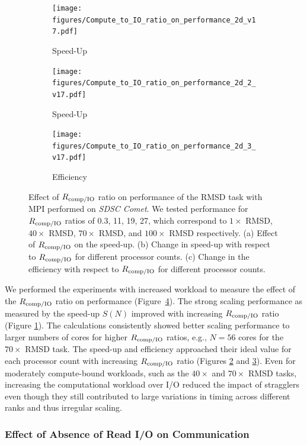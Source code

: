 \begin{figure}[!htb]
  \centering
  \begin{subfigure} {.3\textwidth}
    \texttt{[image: figures/Compute\_to\_IO\_ratio\_on\_performance\_2d\_v17.pdf]}
    \caption{Speed-Up}
    \label{fig:S1_tcomp_tIO_effect}
  \end{subfigure}
  \hfill
  \begin{subfigure}{.3\textwidth}
    \texttt{[image: figures/Compute\_to\_IO\_ratio\_on\_performance\_2d\_2\_v17.pdf]}
    \caption{Speed-Up}
    \label{fig:S2_tcomp_tIO_effect}
  \end{subfigure}
  \hfill
  \begin{subfigure}{.3\textwidth}
    \texttt{[image: figures/Compute\_to\_IO\_ratio\_on\_performance\_2d\_3\_v17.pdf]}
    \caption{Efficiency}
    \label{fig:E_tcomp_tIO_effect}
  \end{subfigure}
  \caption{Effect of $R_{\text{comp/IO}}$ ratio on performance of the RMSD task with MPI performed on \emph{SDSC Comet}. We tested performance for $R_{\text{comp/IO}}$ ratios of 0.3, 11, 19, 27, which correspond to $1\times$ RMSD, $40\times$ RMSD, $70\times$ RMSD, and $100\times$ RMSD respectively.
    (a) Effect of $R_{\text{comp/IO}}$ on the speed-up.
    (b) Change in speed-up with respect to $R_{\text{comp/IO}}$ for different processor counts.
    (c) Change in the efficiency with respect to $R_{\text{comp/IO}}$ for different processor counts.}
  \label{fig:tcomp_tIO_effect}
\end{figure}

We performed the experiments with increased workload to measure the effect of the $R_{\text{comp/IO}}$ ratio on performance (Figure~\ref{fig:tcomp_tIO_effect}).
The strong scaling performance as measured by the speed-up $S(N)$ improved with increasing $R_{\text{comp/IO}}$ ratio (Figure \ref{fig:S1_tcomp_tIO_effect}).
The calculations consistently showed better scaling performance to larger numbers of cores for higher $R_{\text{comp/IO}}$ ratios, e.g., $N=56$ cores for the $70\times$ RMSD task. 
The speed-up and efficiency approached their ideal value for each processor count with increasing $R_{\text{comp/IO}}$ ratio (Figures \ref{fig:S2_tcomp_tIO_effect} and \ref{fig:E_tcomp_tIO_effect}).
Even for moderately compute-bound workloads, such as the $40\times$ and $70\times$ RMSD tasks, increasing the computational workload over I/O reduced the impact of stragglers even though they still contributed to large variations in timing across different ranks and thus irregular scaling.



\subsubsection{Effect of Absence of Read I/O on Communication}

